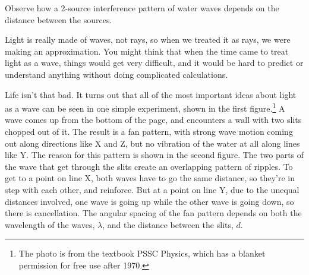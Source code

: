 \label{lab:two-source-interference}

\apparatus
{}

\begin{goals}

\item[] Observe how a 2-source interference
pattern of water waves depends on the distance between the sources.


\end{goals}

\observations

Light is really made of waves, not rays, so when we treated it as
rays, we were making an approximation. You might think that when
the time came to treat light as a wave, things would get very difficult,
and it would be hard to predict or understand anything without doing
complicated calculations.


Life isn't that bad. It turns out that all of the most important
ideas about light as a wave can be seen in one simple experiment, shown in the
first figure.\footnote{The photo is from the textbook PSSC Physics, which has
a blanket permission for free use after 1970.} A wave comes up from the bottom
of the page, and encounters a wall with two slits chopped out of it. The result
is a fan pattern, with strong wave motion coming out along directions like X and
Z, but no vibration of the water at all along lines like Y. The reason for this
pattern is shown in the second figure. The two parts of the wave that get through
the slits create an overlapping pattern of ripples. To get to a point on line X, both
waves have to go the same distance, so they're in step with each other, and
reinforce. But at a point on line Y, due to the unequal distances involved,
one wave is going up while the other wave is going down, so there is cancellation.
The angular spacing of the fan pattern depends on both the wavelength of the waves,
$\lambda$, and the distance between the slits, $d$.


